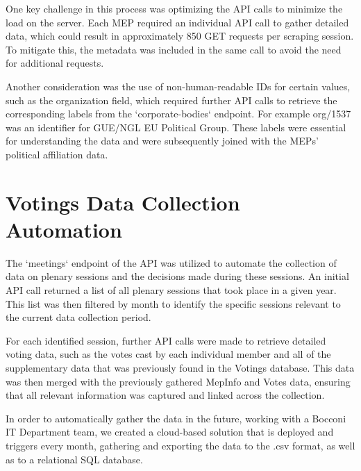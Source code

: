 \documentclass{report}
\begin{document}
            One key challenge in this process was optimizing the API calls to minimize the load on the server. Each MEP
            required
            an individual API call to gather detailed data, which could result in approximately 850 GET requests per
            scraping
            session. To mitigate this, the metadata was included in the same call to avoid the need for additional
            requests.

            Another consideration was the use of non-human-readable IDs for certain values, such as the organization
            field,
            which required further API calls to retrieve the corresponding labels from the `corporate-bodies` endpoint.
            For
            example org/1537 was an identifier for GUE/NGL EU Political Group. These labels were essential for
            understanding the
            data and were subsequently joined with the MEPs' political affiliation data.


        \section{Votings Data Collection Automation}

            The `meetings` endpoint of the API was utilized to automate the collection of data on plenary sessions and
            the
            decisions made during these sessions. An initial API call returned a list of all plenary sessions that took
            place in
            a given year. This list was then filtered by month to identify the specific sessions relevant to the current
            data
            collection period.

            For each identified session, further API calls were made to retrieve detailed voting data, such as the votes
            cast by
            each individual member and all of the supplementary data that was previously found in the Votings database.
            This
            data was then merged with the previously gathered MepInfo and Votes data, ensuring that all relevant
            information was
            captured and linked across the collection.

            In order to automatically gather the data in the future, working with a Bocconi IT Department team, we
            created a
            cloud-based solution that is deployed and triggers every month, gathering and exporting the data to the .csv
            format,
            as well as to a relational SQL database.
\end{document}
